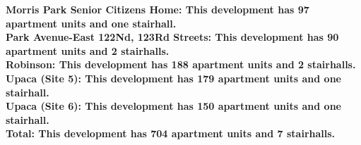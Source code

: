 \bf{Morris Park Senior Citizens Home}: This development has 97 apartment units and one stairhall.\\\bf{Park Avenue-East 122Nd, 123Rd Streets}: This development has 90 apartment units and 2 stairhalls.\\\bf{Robinson}: This development has 188 apartment units and 2 stairhalls.\\\bf{Upaca (Site 5)}: This development has 179 apartment units and one stairhall.\\\bf{Upaca (Site 6)}: This development has 150 apartment units and one stairhall.\\\bf{Total}: This development has 704 apartment units and 7 stairhalls.\\